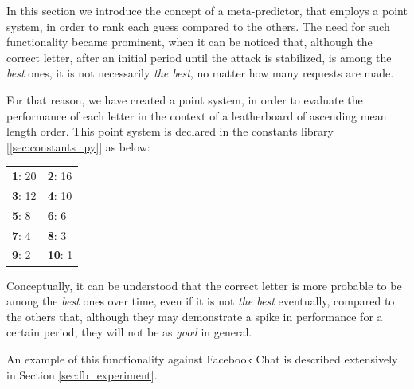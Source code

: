 In this section we introduce the concept of a meta-predictor, that employs a
point system, in order to rank each guess compared to the others. The need for
such functionality became prominent, when it can be noticed that, although the correct letter, after an initial period
until the attack is stabilized, is among the \textit{best} ones, it is not
necessarily \textit{the best}, no matter how many requests are made.

For that reason, we have created a point system, in order to evaluate the
performance of each letter in the context of a leatherboard of ascending mean
length order. This point system is declared in the constants library
[\ref{sec:constants_py}] as below:

\begin{table}[H] \centering \begin{tabular} { | l | l | } \hline \textbf{1}: 20
& \textbf{2}: 16 \\ \textbf{3}: 12 & \textbf{4}: 10 \\ \textbf{5}: 8 &
\textbf{6}: 6 \\ \textbf{7}: 4 & \textbf{8}: 3 \\ \textbf{9}: 2 & \textbf{10}: 1
\\ \hline \end{tabular} \end{table}

Conceptually, it can be understood that the correct letter is more probable to
be among the \textit{best} ones over time, even if it is not \textit{the best}
eventually, compared to the others that, although they may demonstrate a spike
in performance for a certain period, they will not be as \textit{good} in
general.

An example of this functionality against Facebook Chat is described extensively
in Section \ref{sec:fb_experiment}.
